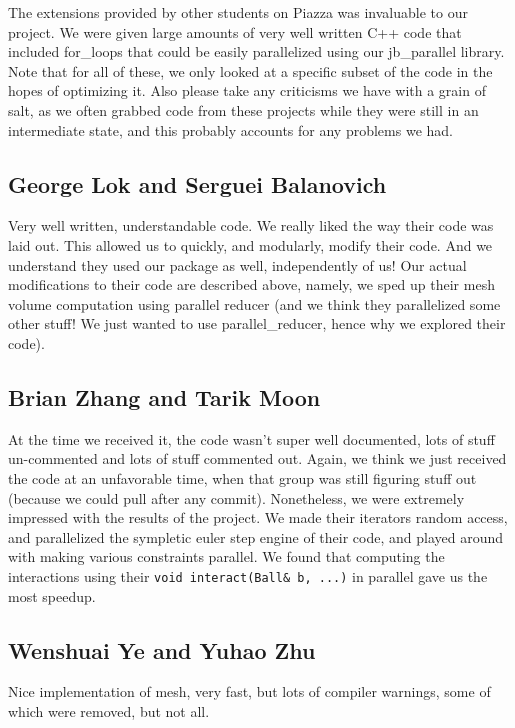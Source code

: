 \documentclass{article}
\begin{document}
The extensions provided by other students on Piazza was invaluable to our project. We were given large amounts of very well written C++ code that included for\_loops that could be easily parallelized using our jb\_parallel library.  Note that for all of these, we only looked at a specific subset of the code in the hopes of optimizing it.  Also please take any criticisms we have with a grain of salt, as we often grabbed code from these projects while they were still in an intermediate state, and this probably accounts for any problems we had.

\subsection{George Lok and Serguei Balanovich}

Very well written, understandable code.  We really liked the way their code was laid out.  This allowed us to quickly, and modularly, modify their code.  And we understand they used our package as well, independently of us!  Our actual modifications to their code are described above, namely, we sped up their mesh volume computation using parallel reducer (and we think they parallelized some other stuff!  We just wanted to use parallel\_reducer, hence why we explored their code).

\subsection{Brian Zhang and Tarik Moon}

At the time we received it, the code wasn't super well documented, lots of stuff un-commented and lots of stuff commented out.  Again, we think we just received the code at an unfavorable time, when that group was still figuring stuff out (because we could pull after any commit).  Nonetheless, we were extremely impressed with the results of the project.  We made their iterators random access, and parallelized the sympletic euler step engine of their code, and played around with making various constraints parallel.  We found that computing the interactions using their \texttt{void interact(Ball\& b, ...)} in parallel gave us the most speedup.

\subsection{Wenshuai Ye and Yuhao Zhu}

Nice implementation of mesh, very fast, but lots of compiler warnings, some of which were removed, but not all.
\end{document}
